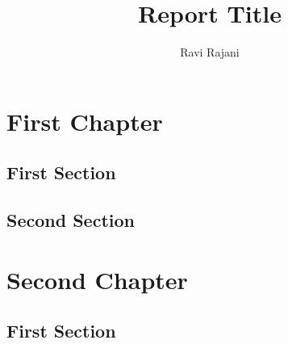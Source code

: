\documentclass[12pt]{report}
\title{Report Title}
\author{Ravi Rajani}
\date{}
\begin{document}

\maketitle
\tableofcontents
\chapter{First Chapter}
\section{First Section}

\section{Second Section}

\chapter{Second Chapter}
\section{First Section}

\end{document}
